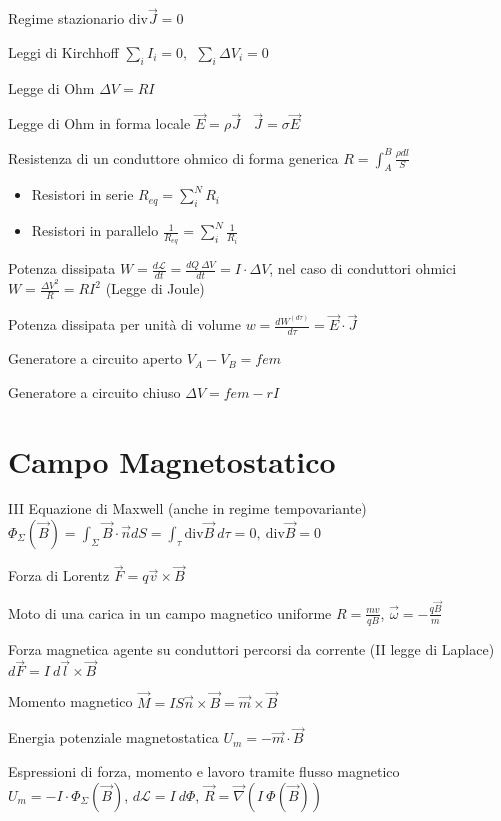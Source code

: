 \documentclass[8pt,a4paper]{article}
\numberwithin{equation}{subsection}
\begin{document}
\begin{multicols}{2}
Regime stazionario $\text{div}\vec{J} =0$

Leggi di Kirchhoff $\sum _{i} I_{i} =0,\ \ \sum _{i} \Delta V_{i} =0$

Legge di Ohm $\Delta V=RI$

Legge di Ohm in forma locale $\vec{E} =\rho \vec{J} \ \ \ \ \vec{J} =\sigma \vec{E}$

Resistenza di un conduttore ohmico di forma generica $R=\int ^{B}_{A}\frac{\rho dl}{S}$
\begin{itemize}
\item Resistori in serie $R_{eq} =\sum ^{N}_{i} R_{i}$
\item Resistori in parallelo $\frac{1}{R_{eq}} =\sum ^{N}_{i}\frac{1}{R_{i}}$
\end{itemize}

Potenza dissipata $W=\frac{d\mathcal{L}}{dt} =\frac{dQ\ \Delta V}{dt} =I\cdot \Delta V$, nel caso di conduttori ohmici $W=\frac{\Delta V^{2}}{R} =RI^{2}$ (Legge di Joule)

Potenza dissipata per unità di volume $w=\frac{dW^{(d\tau )}}{d\tau } =\vec{E} \cdot \vec{J}$

Generatore a circuito aperto $V_{A} -V_{B} =fem$

Generatore a circuito chiuso $\Delta V=fem-rI$
\section*{Campo Magnetostatico}

III Equazione di Maxwell (anche in regime tempovariante) \\$\Phi _{\Sigma } (\vec{B} )=\int _{\Sigma }\vec{B} \cdot \vec{n} dS=\int _{\tau }\text{div}\vec{B} \ d\tau =0,\ \text{div}\vec{B} =0$

Forza di Lorentz $\vec{F} =q\vec{v} \times \vec{B}$

Moto di una carica in un campo magnetico uniforme $R=\frac{mv}{qB}$, $\vec{\omega } =-\frac{q\vec{B}}{m}$

Forza magnetica agente su conduttori percorsi da corrente (II legge di Laplace) $d\vec{F} =I\ d\vec{l} \times \vec{B}$

Momento magnetico $\vec{M} =IS\vec{n} \times \vec{B} =\vec{m} \times \vec{B}$

Energia potenziale magnetostatica $U_{m} =-\vec{m} \cdot \vec{B}$

Espressioni di forza, momento e lavoro tramite flusso magnetico $U_{m} =-I\cdot \Phi _{\Sigma } (\vec{B} )$, $d\mathcal{L} =I\ d\Phi $, $\vec{R} =\vec{\nabla } (I\ \Phi (\vec{B} ))$


\end{multicols}
\end{document}
